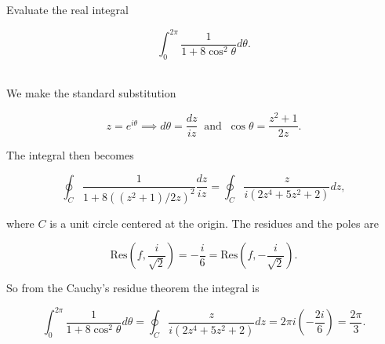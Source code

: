 \documentclass[english,a4paper,12pt]{report}
\begin{document}
{Evaluate the real integral

\begin{equation}
    \int_{0}^{2\pi } \frac{1}{1+8\cos ^2\theta } d \theta .   
\end{equation}
~
}
{We make the standard substitution 

\begin{equation}
    z = e^{i \theta } \implies d \theta = \frac{dz}{iz} ~\text { and }~ \cos \theta = \frac{z^2+1}{2z}.  
\end{equation}

The integral then becomes

\begin{equation}
    \oint_{C} \frac{1}{1+8 ((z^2+1) /2z)^2} \frac{dz}{i z} = \oint_{C} \frac{z}{i(2z^{4} + 5z^2+2)}dz,   
\end{equation}

where \(C\) is a unit circle centered at the origin. The residues and the poles are 

\begin{equation}
    \text{Res} \left( f, \frac{i}{\sqrt{2} }  \right) = -\frac{i}{6} = \text{Res} \left( f, -\frac{i}{\sqrt{2} }  \right).
\end{equation}

So from the Cauchy's residue theorem the integral is 

\begin{equation}
    \int_{0}^{2\pi } \frac{1}{1+8\cos ^2\theta } d \theta = \oint_{C} \frac{z}{i(2z^{4} + 5z^2+2)}dz = 2\pi i \left( -\frac{2i}{6}  \right) = \frac{2\pi }{3}. 
\end{equation}
~} 
\end{document}
